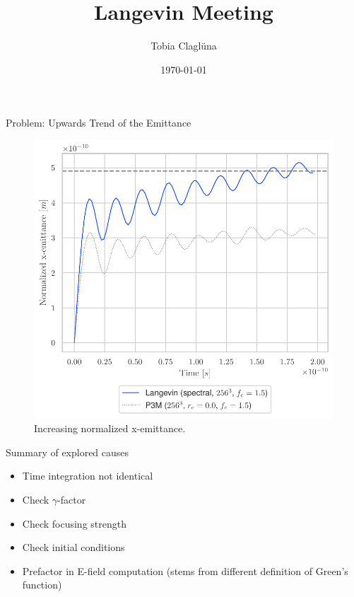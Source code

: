 
\title[\today]{Langevin Meeting}

\author{Tobia Claglüna}
\date{\today}
\def \myEmail {tobia.clagluena@psi.ch}




\begin{frame}{Problem: Upwards Trend of the Emittance}
    \begin{figure}[!htb]
        \centering
        \captionsetup{justification=centering}
      \includegraphics[width=0.6\linewidth]{figures/comparison_spectral_spectral_divergence.pdf}
        \caption{Increasing normalized x-emittance.}
      \label{fig:problem_statement}
    \end{figure}
\end{frame}

\begin{frame}{Summary of explored causes}
            \begin{itemize}
                \item Time integration not identical \done
                \item Check $\gamma$-factor \done
                \item Check focusing strength \done
                \item Check initial conditions \done
                \item Prefactor in E-field computation (stems from different definition of Green's function) \done
            \end{itemize}
\end{frame}

